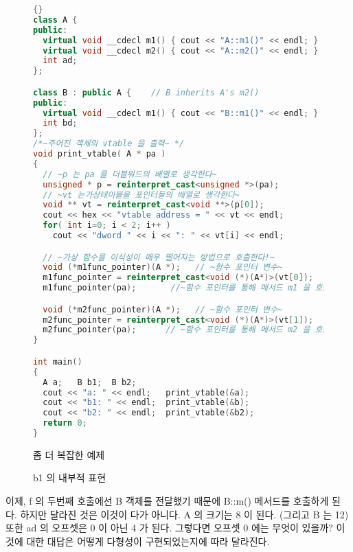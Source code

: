 \begin{figure}[tp]
\begin{lstlisting}[language=C++, frame=tlrb,escapeinside=~~]{}
class A {
public:
  virtual void __cdecl m1() { cout << "A::m1()" << endl; }
  virtual void __cdecl m2() { cout << "A::m2()" << endl; }
  int ad;
};

class B : public A {    // B inherits A's m2()
public:
  virtual void __cdecl m1() { cout << "B::m1()" << endl; }
  int bd;
};
/*~주어진 객체의 vtable 을 출력~ */
void print_vtable( A * pa )
{
  // ~p 는 pa 를 더블워드의 배열로 생각한다~
  unsigned * p = reinterpret_cast<unsigned *>(pa);
  // ~vt 는가상테이블을 포인터들의 배열로 생각한다~
  void ** vt = reinterpret_cast<void **>(p[0]);
  cout << hex << "vtable address = " << vt << endl;
  for( int i=0; i < 2; i++ )
    cout << "dword " << i << ": " << vt[i] << endl;

  // ~가상 함수를 이식성이 매우 떨어지는 방법으로 호출한다!~
  void (*m1func_pointer)(A *);   // ~함수 포인터 변수~
  m1func_pointer = reinterpret_cast<void (*)(A*)>(vt[0]);
  m1func_pointer(pa);       //~함수 포인터를 통해 메서드 m1 을 호출~

  void (*m2func_pointer)(A *);   // ~함수 포인터 변수~
  m2func_pointer = reinterpret_cast<void (*)(A*)>(vt[1]);
  m2func_pointer(pa);      // ~함수 포인터를 통해 메서드 m2 을 호출~
}

int main()
{
  A a;   B b1;  B b2;
  cout << "a: " << endl;   print_vtable(&a);
  cout << "b1: " << endl;  print_vtable(&b);
  cout << "b2: " << endl;  print_vtable(&b2);
  return 0;
}
\end{lstlisting}
\caption{ 좀 더 복잡한 예제 \label{fig:2mEx}}
\end{figure}


\begin{figure}[tp]
\centering

\caption{{\code b1} 의 내부적 표현\label{fig:vtable}}
\end{figure}

이제, {\code f} 의 두번째 호출에선 {\code B} 객체를 전달했기 때문에 {\code B::m()} 메서드를
호출하게 된다. 하지만 달라진 것은 이것이 다가 아니다. {\code A} 의 크기는 8 이 된다. (그리고
{\code B} 는 12) 또한 {\code ad} 의 오프셋은 0 이 아닌 4 가 된다. 그렇다면 오프셋 0 에는 무엇이
있을까? 이것에 대한 대답은 어떻게 다형성이 구현되었는지에 따라 달라진다. 

